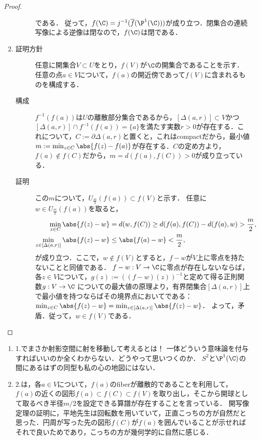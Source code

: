 \documentclass[uplatex,dvipdfmx]{jsreport}
\begin{document}
\begin{proof}
\begin{enumerate}
\begin{description}
            である．
            従って，$f(\C)=j^{-1}(\overline{f}(\P^1(\C)))$が成り立つ．閉集合の連続写像による逆像は閉なので，$f(\C)$は閉である．
        \end{description}
        \item
        \begin{description}
            \item[証明方針] 任意に開集合$V\subset U$をとり，$f(V)$が$\C$の開集合であることを示す．任意の点$a\in V$について，$f(a)$の開近傍であって$f(V)$に含まれるものを構成する．
            \item[構成] 
            $f^{-1}(f(a))$は$U$の離散部分集合であるから，$[\Delta(a,r)]\subset V$かつ$[\Delta(a,r)]\cap f^{-1}(f(a))=\{a\}$を満たす実数$r>0$が存在する．これについて，$C:=\partial\Delta(a,r)$と置くと，これはcompactだから，最小値
            $m:=\min_{z\in C}\abs{f(z)-f(a)}$が存在する．$C$の定め方より，$f(a)\notin f(C)$だから，$m=d(f(a),f(C))>0$が成り立っている．
            \item[証明]
            この$m$について，$U_{\frac{m}{2}}(f(a))\subset f(V)$と示す．
            任意に$w\in U_{\frac{m}{2}}(f(a))$を取ると，
            \begin{align*}
                \min_{z\in C}\abs{f(z)-w}&=d(w,f(C))\ge d(f(a),f(C))-d(f(a),w)>\frac{m}{2},\\
                \min_{z\in [\Delta(a,r)]}\abs{f(z)-w}&\le \abs{f(a)-w}<\frac{m}{2},
            \end{align*}
            が成り立つ．ここで，$w\notin f(V)$とすると，$f-w$が$V$上に零点を持たないことと同値である．
            $f-w:V\to\C$に零点が存在しないならば，各$z\in V$について，$g(z):=((f-w)(z))^{-1}$と定めて得る正則関数$g:V\to\C$
            についての最大値の原理より，有界閉集合$[\Delta(a,r)]$上で最小値を持つならばその境界点においてである：$\min_{z\in C}\abs{f(z)-w}=\min_{z\in [\Delta(a,r)]}\abs{f(z)-w}$．
            よって，矛盾．従って，$w\in f(V)$である．
        \end{description}
    \end{enumerate}
\end{proof}
\begin{remarks}\mbox{}
    \begin{enumerate}
        \item 1.でまさか射影空間に射を移動して考えるとは！
        一体どういう意味論を付与すればいいのか全くわからない．どうやって思いつくのか．
        $S^2$と$\P^1(\C)$の間にあるはずの同型も私の心の地図にはない．
        \item 2.は，各$a\in V$について，$f(a)$のfiberが離散的であることを利用して，$f(a)$の近くの図形$f(a)\subset f(C)\subset f(V)$を取り出し，そこから開球として取るべき半径$m/2$を設定できる算譜が存在することを言っている．
        開写像定理の証明に，平地先生は回転数を用いていて，正直こっちの方が自然だと思った．円周が写った先の図形$f(C)$が$f(a)$を囲んでいることが示せればそれで良いためであり，こっちの方が幾何学的に自然に感じる．
    \end{enumerate}
\end{remarks}
\end{document}
